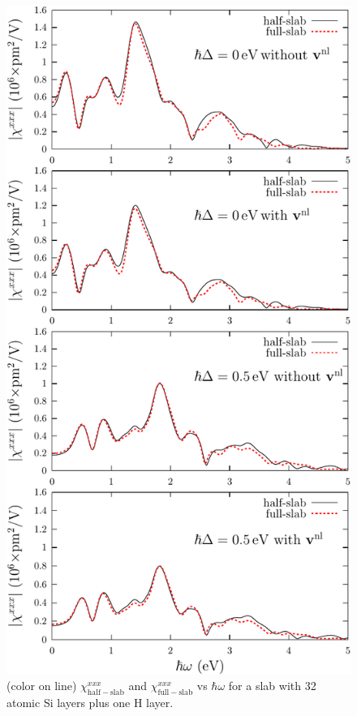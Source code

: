 \begin{figure}
\centering 
\includegraphics[scale=.8]{figures/03-results/chi2/fig4}
\caption{(color on line) 
$\chi^{xxx}_{\mathrm{half-slab}}$ and $\chi^{xxx}_{\mathrm{full-slab}}$ vs
$\hbar\omega$ for a slab with 32 atomic Si layers plus one H layer.
\label{fig2}} 
\end{figure}

